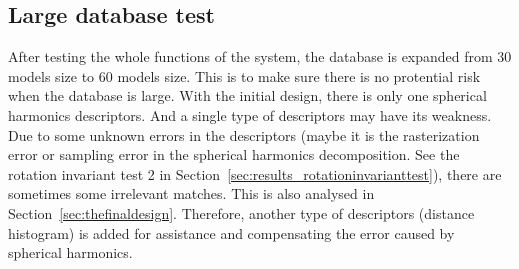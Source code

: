 \subsection{Large database test}

After testing the whole functions of the system, the database is expanded from 30 models size to 60 models size. This is to make sure there is no protential risk when the database is large. With the initial design, there is only one spherical harmonics descriptors. And a single type of descriptors may have its weakness. Due to some unknown errors in the descriptors (maybe it is the rasterization error or sampling error in the spherical harmonics decomposition. See the rotation invariant test 2 in Section~\ref{sec:results_rotationinvarianttest}), there are sometimes some irrelevant matches. This is also analysed in Section~\ref{sec:thefinaldesign}.  Therefore, another type of descriptors (distance histogram) is added for assistance and compensating the error caused by spherical harmonics. 



